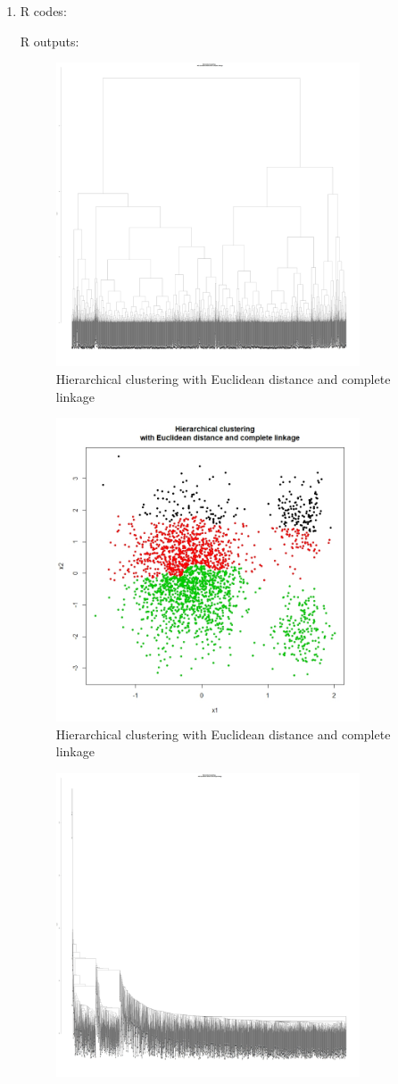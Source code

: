 \documentclass[10pt]{article}
\begin{document}
\begin{enumerate}[1)]
\item
R codes:

R outputs:

\begin{figure}[H]
  \centering
  \includegraphics[width=9cm,height=9cm]{p32a.jpeg}
  \caption{Hierarchical clustering with Euclidean distance and complete linkage}
\end{figure}
\begin{figure}[H]
  \centering
  \includegraphics[width=9cm,height=9cm]{p32b.jpeg}
  \caption{Hierarchical clustering with Euclidean distance and complete linkage}
\end{figure}

\begin{figure}[H]
  \centering
  \includegraphics[width=9cm,height=9cm]{p32c.jpeg}

\end{figure}
\end{enumerate}
\end{document}
